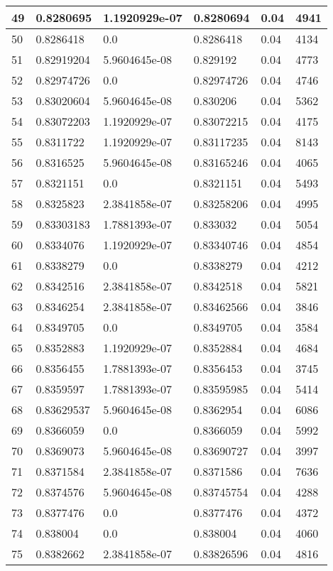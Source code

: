 \begin{longtable}{|l|l|l|l|l|l|}
49 & 0.8280695 & 1.1920929e-07 & 0.8280694 & 0.04 & 4941 \\ \hline 
50 & 0.8286418 & 0.0 & 0.8286418 & 0.04 & 4134 \\ \hline 
51 & 0.82919204 & 5.9604645e-08 & 0.829192 & 0.04 & 4773 \\ \hline 
52 & 0.82974726 & 0.0 & 0.82974726 & 0.04 & 4746 \\ \hline 
53 & 0.83020604 & 5.9604645e-08 & 0.830206 & 0.04 & 5362 \\ \hline 
54 & 0.83072203 & 1.1920929e-07 & 0.83072215 & 0.04 & 4175 \\ \hline 
55 & 0.8311722 & 1.1920929e-07 & 0.83117235 & 0.04 & 8143 \\ \hline 
56 & 0.8316525 & 5.9604645e-08 & 0.83165246 & 0.04 & 4065 \\ \hline 
57 & 0.8321151 & 0.0 & 0.8321151 & 0.04 & 5493 \\ \hline 
58 & 0.8325823 & 2.3841858e-07 & 0.83258206 & 0.04 & 4995 \\ \hline 
59 & 0.83303183 & 1.7881393e-07 & 0.833032 & 0.04 & 5054 \\ \hline 
60 & 0.8334076 & 1.1920929e-07 & 0.83340746 & 0.04 & 4854 \\ \hline 
61 & 0.8338279 & 0.0 & 0.8338279 & 0.04 & 4212 \\ \hline 
62 & 0.8342516 & 2.3841858e-07 & 0.8342518 & 0.04 & 5821 \\ \hline 
63 & 0.8346254 & 2.3841858e-07 & 0.83462566 & 0.04 & 3846 \\ \hline 
64 & 0.8349705 & 0.0 & 0.8349705 & 0.04 & 3584 \\ \hline 
65 & 0.8352883 & 1.1920929e-07 & 0.8352884 & 0.04 & 4684 \\ \hline 
66 & 0.8356455 & 1.7881393e-07 & 0.8356453 & 0.04 & 3745 \\ \hline 
67 & 0.8359597 & 1.7881393e-07 & 0.83595985 & 0.04 & 5414 \\ \hline 
68 & 0.83629537 & 5.9604645e-08 & 0.8362954 & 0.04 & 6086 \\ \hline 
69 & 0.8366059 & 0.0 & 0.8366059 & 0.04 & 5992 \\ \hline 
70 & 0.8369073 & 5.9604645e-08 & 0.83690727 & 0.04 & 3997 \\ \hline 
71 & 0.8371584 & 2.3841858e-07 & 0.8371586 & 0.04 & 7636 \\ \hline 
72 & 0.8374576 & 5.9604645e-08 & 0.83745754 & 0.04 & 4288 \\ \hline 
73 & 0.8377476 & 0.0 & 0.8377476 & 0.04 & 4372 \\ \hline 
74 & 0.838004 & 0.0 & 0.838004 & 0.04 & 4060 \\ \hline 
75 & 0.8382662 & 2.3841858e-07 & 0.83826596 & 0.04 & 4816 \\ \hline 
\end{longtable}